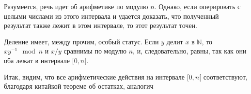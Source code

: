 \documentclass{../../template/mai_book}
\begin{document}
    Разумеется, речь идет об арифметике по модулю $n$. Однако, если оперировать с целыми числами из этого интервала и удается доказать, что полученный результат также лежит в этом интервале, то этот результат точен.

    Деление имеет, между прочим, особый статус. Если $y$ делит $x$ в $\mathbb{N}$, то $xy^{-1} \mod n$ и $x/y$ сравнимы по модулю $n$, и, следовательно, равны, так как они оба лежат в интервале $[0, n [$.

    Итак, видим, что все арифметические действия на интервале $[0, n [$ \linebreak соответствуют, благодаря китайкой теореме об остатках, аналогич-\linebreak


    
\end{document}
